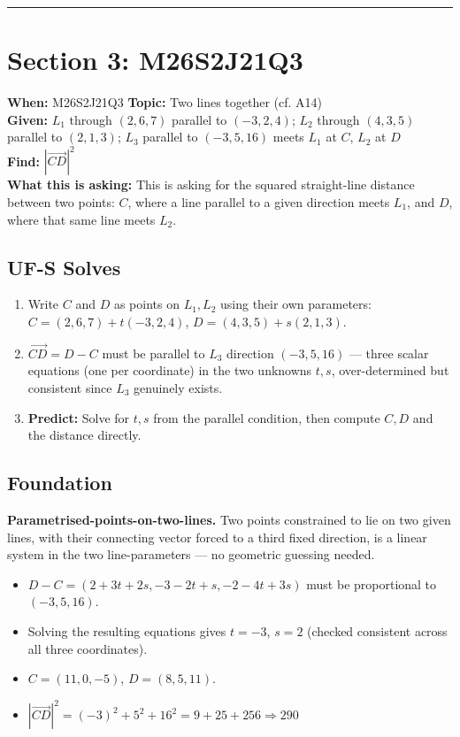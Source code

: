 \documentclass{article}
\begin{document}
\vspace{1em}
\hrule
\vspace{1em}

\section*{Section 3: M26S2J21Q3} %

\noindent \textbf{When:} M26S2J21Q3 \quad \textbf{Topic:} Two lines together (cf. A14) \\ %
\textbf{Given:} $L_1$ through $(2,6,7)$ parallel to $(-3,2,4)$; $L_2$ through $(4,3,5)$ parallel to $(2,1,3)$; $L_3$ parallel to $(-3,5,16)$ meets $L_1$ at $C$, $L_2$ at $D$ \\ %
\textbf{Find:} $|\vec{CD}|^2$ \\[0.5em] %
\textbf{What this is asking:} This is asking for the squared straight-line distance between two points: $C$, where a line parallel to a given direction meets $L_1$, and $D$, where that same line meets $L_2$. %

\subsection*{UF-S Solves} %
\begin{enumerate}
    \item Write $C$ and $D$ as points on $L_1, L_2$ using their own parameters: $C = (2,6,7) + t(-3,2,4)$, $D = (4,3,5) + s(2,1,3)$. %
    \item $\vec{CD} = D - C$ must be parallel to $L_3$ direction $(-3,5,16)$ --- three scalar equations (one per coordinate) in the two unknowns $t, s$, over-determined but consistent since $L_3$ genuinely exists. %
    \item \textbf{Predict:} Solve for $t, s$ from the parallel condition, then compute $C, D$ and the distance directly. %
\end{enumerate}

\subsection*{Foundation} %
\noindent \textbf{Parametrised-points-on-two-lines.} Two points constrained to lie on two given lines, with their connecting vector forced to a third fixed direction, is a linear system in the two line-parameters --- no geometric guessing needed. %
\begin{itemize}
    \item $D - C = (2 + 3t + 2s, -3 - 2t + s, -2 - 4t + 3s)$ must be proportional to $(-3, 5, 16)$. %
    \item Solving the resulting equations gives $t = -3$, $s = 2$ (checked consistent across all three coordinates). %
    \item $C = (11,0,-5)$, $D = (8,5,11)$. %
    \item $|\vec{CD}|^2 = (-3)^2 + 5^2 + 16^2 = 9 + 25 + 256 \Rightarrow \boxed{290}$ %
\end{itemize}
\end{document}
